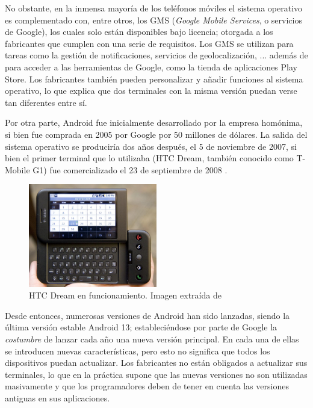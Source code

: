         No obstante, en la inmensa mayoría de los teléfonos móviles el sistema operativo es complementado con,
        entre otros, los GMS (\textit{Google Mobile Services}, o servicios de Google), los cuales solo están 
        disponibles bajo licencia; otorgada a los fabricantes que cumplen con una serie de requisitos. Los GMS 
        se utilizan para tareas como la gestión de notificaciones, servicios de geolocalización, ... además de para 
        acceder a las herramientas de Google, como la tienda de aplicaciones Play Store. Los fabricantes también 
        pueden personalizar y añadir funciones al sistema operativo, lo que explica que dos terminales con la misma 
        versión puedan verse tan diferentes entre sí. 
        

        Por otra parte, Android fue inicialmente desarrollado por la empresa homónima, si bien fue comprada en 2005
        por Google por 50 millones de dólares. La salida del sistema operativo se produciría dos años después, el 5 
        de noviembre de 2007, si bien el primer terminal que lo utilizaba (HTC Dream, también conocido como 
        T-Mobile G1) fue comercializado el 23 de septiembre de 2008 \cite{adeva_android_2023} \cite{marquez_asi_2022}.

        \begin{figure}[h]
            \centering
            \includegraphics[width=0.5\textwidth]{figures/HTC Dream.jpg}
            \caption[HTC Dream en funcionamiento.]{HTC Dream en funcionamiento. Imagen extraída de \cite{oryl_t-mobile_2008}}
            \label{figure:android:htc_dream}
        \end{figure}

        Desde entonces, numerosas versiones de Android han sido lanzadas, siendo la última versión estable Android 
        13; estableciéndose por parte de Google la \textit{costumbre} de lanzar cada año una nueva versión principal. 
        En cada una de ellas se introducen nuevas características, pero esto no significa que todos los dispositivos 
        puedan actualizar. Los fabricantes no están obligados a actualizar sus terminales, lo que en la práctica 
        supone que las nuevas versiones no son utilizadas masivamente y que los programadores deben de tener en 
        cuenta las versiones antiguas en sus aplicaciones. 
        

